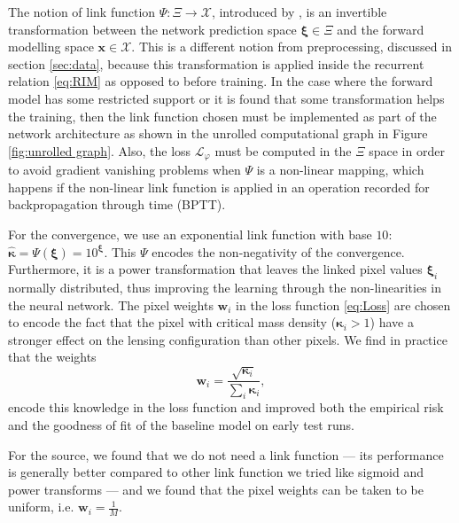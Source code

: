 The notion of link function $\Psi: \Xi \rightarrow \mathcal{X}$, 
introduced by \citet{Putzky2017}, is an invertible transformation 
between the network prediction space $\boldsymbol{\xi} \in \Xi$ 
and the forward modelling space $\mathbf{x} \in \mathcal{X}$.
This is a different notion from preprocessing, discussed in section \ref{sec:data}, 
because this transformation is applied inside the recurrent relation \ref{eq:RIM} 
as opposed to before training. In the case where the forward model has some restricted 
support or it is found that some transformation helps the training, then 
the link function chosen must be implemented as part of the network architecture as 
shown in the unrolled computational graph in Figure \ref{fig:unrolled graph}.
Also, the loss $\mathcal{L}_\varphi$ must be computed in the $\Xi$ space in order 
to avoid gradient vanishing problems when $\Psi$ is a non-linear mapping, which 
happens if the non-linear link function is applied in an 
operation recorded for backpropagation through time (BPTT). 


For the convergence, we use an exponential link function with base $10$: 
$\boldsymbol{\hat{\kappa}} = \Psi(\boldsymbol{\xi}) = 10^{\boldsymbol{\xi}}$. 
This $\Psi$ encodes the non-negativity of the convergence. Furthermore, 
it is a power transformation that leaves the linked 
pixel values $\boldsymbol{\xi}_i$ normally distributed, thus improving the 
learning through the non-linearities in the neural network.
The pixel weights $\mathbf{w}_i$ in the loss function \eqref{eq:Loss}
are chosen to encode the fact that the pixel with critical mass density ($\boldsymbol{\kappa}_i > 1$) 
have a stronger effect on the lensing configuration than other pixels. 
We find in practice that the weights 
\begin{equation}\label{eq:convergence weights} 
        \mathbf{w}_i = \frac{\sqrt{\boldsymbol{\kappa}_i}}{ \sum_i \boldsymbol{\kappa}_i}, 
\end{equation} 
encode this knowledge in the loss function and improved both the empirical 
risk and the goodness of fit of the baseline model on early test runs.

For the source, we found that we do not need a link function 
--- its performance is generally better compared to other link function we tried like sigmoid and 
power transforms --- and we found that the pixel weights can be taken to 
be uniform, i.e. $\mathbf{w}_i = \frac{1}{M}$.



